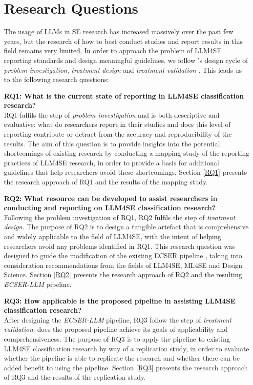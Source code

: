 \documentclass[a4paper]{article}
\newcommand{\emphasize}[1]{\textbf{#1}}
\newcommand{\newecser}{\textit{ECSER-LLM} }
\begin{document}
\section{Research Questions} \label{Research approach} 

The usage of LLMs in SE research has increased massively over the past few years, but the research of how to best conduct studies and report results in this field remains very limited. In order to approach the problem of LLM4SE reporting standards and design meaningful guidelines, we follow \citeauthor{Wieringa2014}'s design cycle of \textit{problem investigation}, \textit{treatment design} and \textit{treatment validation} \cite{Wieringa2014}. This leads us to the following research questions:

\emphasize{RQ1: What is the current state of reporting in LLM4SE classification research?} \\
RQ1 fulfils the step of \textit{problem investigation} and is both descriptive and evaluative: what do researchers report in their studies and does this level of reporting contribute or detract from the accuracy and reproducibility of the results. The aim of this question is to provide insights into the potential shortcomings of existing research by conducting a mapping study of the reporting practices of LLM4SE research, in order to provide a basis for additional guidelines that help researchers avoid these shortcomings. Section \ref{RQ1} presents the research approach of RQ1 and the results of the mapping study.
	
\emphasize{RQ2: What resource can be developed to assist researchers in conducting and reporting on LLM4SE classification research?}\\
Following the problem investigation of RQ1, RQ2 fulfils the step of \textit{treatment design}. The purpose of RQ2 is to design a tangible artefact that is comprehensive and widely applicable to the field of LLM4SE, with the intent of helping researchers avoid any problems identified in RQ1. This research question was designed to guide the modification of the existing ECSER pipeline \cite{Dellanna2022}, taking into consideration recommendations from the fields of LLM4SE, ML4SE and Design Science. Section \ref{RQ2} presents the research approach of RQ2 and the resulting \newecser pipeline.


\emphasize{RQ3: How applicable is the proposed pipeline in assisting LLM4SE classification research?}\\
After designing the \newecser pipeline, RQ3 follow the step of \textit{treatment validation}: does the proposed pipeline achieve its goals of applicability and comprehensiveness. The purpose of RQ3 is to apply the pipeline to existing LLM4SE classification research by way of a replication study, in order to evaluate whether the pipeline is able to replicate the research and whether there can be added benefit to using the pipeline. Section \ref{RQ3} presents the research approach of RQ3 and the results of the replication study.
\end{document}
